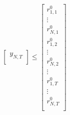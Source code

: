 \documentclass[11pt]{article} %
\begin{document}
\begin{align}
\begin{bmatrix}
        y_{N,T} \\
    \end{bmatrix} \leq
    \begin{bmatrix}
        r_{1,1}^0\\
        \vdots \\
        r_{N,1}^0\\
        r_{1,2}^0\\
        \vdots \\
        r_{N,2}^0\\
        \vdots \\
        r_{1,T}^0\\
        \vdots \\
        r_{N,T}^0\\
    \end{bmatrix}
\end{align}
\end{document}
